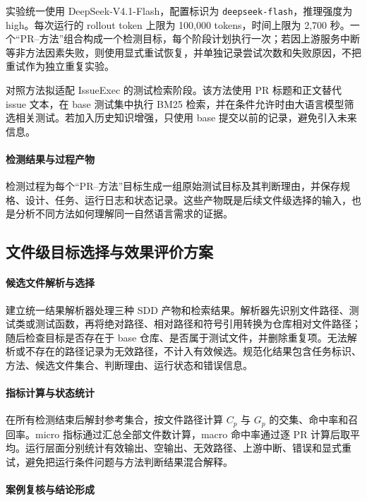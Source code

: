 实验统一使用 DeepSeek-V4.1-Flash，配置标识为 \texttt{deepseek-flash}，推理强度为 high。每次运行的 rollout token 上限为 100,000 tokens，时间上限为 2,700 秒。一个“PR--方法”组合构成一个检测目标，每个阶段计划执行一次；若因上游服务中断等非方法因素失败，则使用显式重试恢复，并单独记录尝试次数和失败原因，不把重试作为独立重复实验。

对照方法拟适配 IssueExec 的测试检索阶段\cite{liu2026issueexec}。该方法使用 PR 标题和正文替代 issue 文本，在 base 测试集中执行 BM25 检索，并在条件允许时由大语言模型筛选相关测试。若加入历史知识增强，只使用 base 提交以前的记录，避免引入未来信息。

\paragraph{检测结果与过程产物}

检测过程为每个“PR--方法”目标生成一组原始测试目标及其判断理由，并保存规格、设计、任务、运行日志和状态记录。这些产物既是后续文件级选择的输入，也是分析不同方法如何理解同一自然语言需求的证据。

\subsection{文件级目标选择与效果评价方案}
\label{sec:plan-select-module}

\paragraph{候选文件解析与选择}

建立统一结果解析器处理三种 SDD 产物和检索结果。解析器先识别文件路径、测试类或测试函数，再将绝对路径、相对路径和符号引用转换为仓库相对文件路径；随后检查目标是否存在于 base 仓库、是否属于测试文件，并删除重复项。无法解析或不存在的路径记录为无效路径，不计入有效候选。规范化结果包含任务标识、方法、候选文件集合、判断理由、运行状态和错误信息。

\paragraph{指标计算与状态统计}

在所有检测结束后解封参考集合，按文件路径计算 $C_p$ 与 $G_p$ 的交集、命中率和召回率。micro 指标通过汇总全部文件数计算，macro 命中率通过逐 PR 计算后取平均。运行层面分别统计有效输出、空输出、无效路径、上游中断、错误和显式重试，避免把运行条件问题与方法判断结果混合解释。

\paragraph{案例复核与结论形成}

